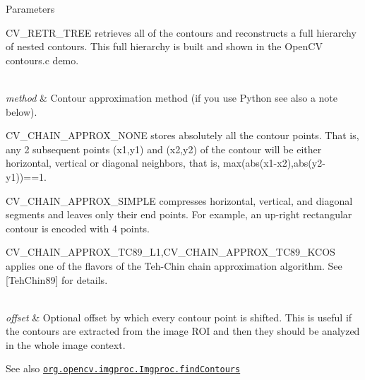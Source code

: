 \begin{DoxyParams}{Parameters}
\begin{DoxyItemize}
\item C\+V\+\_\+\+R\+E\+T\+R\+\_\+\+T\+R\+EE retrieves all of the contours and reconstructs a full hierarchy of nested contours. This full hierarchy is built and shown in the Open\+CV {\ttfamily contours.\+c} demo. 
\end{DoxyItemize}\\
\hline
{\em method} & Contour approximation method (if you use Python see also a note below). 
\begin{DoxyItemize}
\item C\+V\+\_\+\+C\+H\+A\+I\+N\+\_\+\+A\+P\+P\+R\+O\+X\+\_\+\+N\+O\+NE stores absolutely all the contour points. That is, any 2 subsequent points {\ttfamily (x1,y1)} and {\ttfamily (x2,y2)} of the contour will be either horizontal, vertical or diagonal neighbors, that is, {\ttfamily max(abs(x1-\/x2),abs(y2-\/y1))==1}. 
\item C\+V\+\_\+\+C\+H\+A\+I\+N\+\_\+\+A\+P\+P\+R\+O\+X\+\_\+\+S\+I\+M\+P\+LE compresses horizontal, vertical, and diagonal segments and leaves only their end points. For example, an up-\/right rectangular contour is encoded with 4 points. 
\item C\+V\+\_\+\+C\+H\+A\+I\+N\+\_\+\+A\+P\+P\+R\+O\+X\+\_\+\+T\+C89\+\_\+\+L1,C\+V\+\_\+\+C\+H\+A\+I\+N\+\_\+\+A\+P\+P\+R\+O\+X\+\_\+\+T\+C89\+\_\+\+K\+C\+OS applies one of the flavors of the Teh-\/\+Chin chain approximation algorithm. See \mbox{[}Teh\+Chin89\mbox{]} for details. 
\end{DoxyItemize}\\
\hline
{\em offset} & Optional offset by which every contour point is shifted. This is useful if the contours are extracted from the image R\+OI and then they should be analyzed in the whole image context.\\
\hline
\end{DoxyParams}
\begin{DoxySeeAlso}{See also}
\href{http://docs.opencv.org/modules/imgproc/doc/structural_analysis_and_shape_descriptors.html#findcontours}{\tt org.\+opencv.\+imgproc.\+Imgproc.\+find\+Contours} 
\end{DoxySeeAlso}
\mbox{\label{classorg_1_1opencv_1_1imgproc_1_1_imgproc_a007342d8043f1610bb73d105949ab86c}} 
